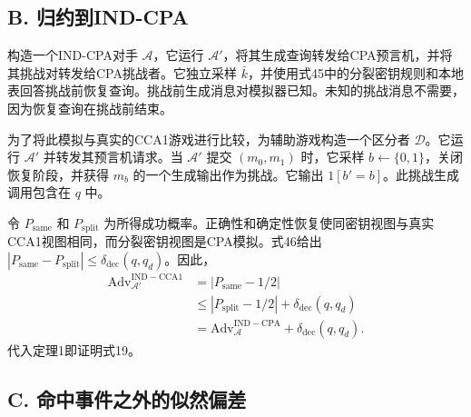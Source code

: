 \subsection*{B. 归约到IND-CPA}

构造一个IND-CPA对手 \(\mathcal{A}\)，它运行 \(\mathcal{A}'\)，将其生成查询转发给CPA预言机，并将其挑战对转发给CPA挑战者。它独立采样 \(\bar{k}\)，并使用式45中的分裂密钥规则和本地表回答挑战前恢复查询。挑战前生成消息对模拟器已知。未知的挑战消息不需要，因为恢复查询在挑战前结束。

为了将此模拟与真实的CCA1游戏进行比较，为辅助游戏构造一个区分者 \(\mathcal{D}\)。它运行 \(\mathcal{A}'\) 并转发其预言机请求。当 \(\mathcal{A}'\) 提交 \((m_0, m_1)\) 时，它采样 \(b \leftarrow \{0, 1\}\)，关闭恢复阶段，并获得 \(m_b\) 的一个生成输出作为挑战。它输出 \(1[b' = b]\)。此挑战生成调用包含在 \(q\) 中。

令 \(P_{\mathrm{same}}\) 和 \(P_{\mathrm{split}}\) 为所得成功概率。正确性和确定性恢复使同密钥视图与真实CCA1视图相同，而分裂密钥视图是CPA模拟。式46给出 \(|P_{\mathrm{same}} - P_{\mathrm{split}}| \le \delta_{\mathrm{dec}}(q, q_d)\)。因此，
\begin{equation}
\begin{aligned}
\mathrm{Adv}_{\mathcal{A}'}^{\mathrm{IND-CCA1}} &= |P_{\mathrm{same}} - 1/2| \\
&\le |P_{\mathrm{split}} - 1/2| + \delta_{\mathrm{dec}}(q, q_d) \\
&= \mathrm{Adv}_{\mathcal{A}}^{\mathrm{IND-CPA}} + \delta_{\mathrm{dec}}(q, q_d).
\end{aligned} \tag{47}
\end{equation}
代入定理1即证明式19。

\subsection*{C. 命中事件之外的似然偏差}

